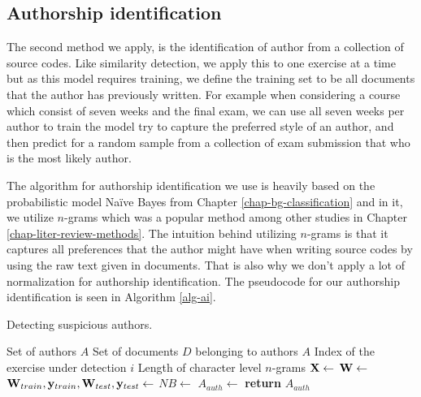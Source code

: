 \subsection{Authorship identification}

The second method we apply, is the identification of author from a collection of source codes. Like similarity detection, we apply this to one exercise at a time but as this model requires training, we define the training set to be all documents that the author has previously written. For example when considering a course which consist of seven weeks and the final exam, we can use all seven weeks per author to train the model \ie try to capture the preferred style of an author, and then predict for a random sample from a collection of exam submission that who is the most likely author.  

The algorithm for authorship identification we use is heavily based on the probabilistic model Naïve Bayes from Chapter \ref{chap-bg-classification} and in it, we utilize $n$-grams which was a popular method among other studies in Chapter \ref{chap-liter-review-methods}. The intuition behind utilizing $n$-grams is that it captures all preferences that the author might have when writing source codes by using the raw text given in documents. That is also why we don't apply a lot of normalization for authorship identification. The pseudocode for our authorship identification is seen in Algorithm \ref{alg-ai}.


\begin{algorithm}[ht]
\caption{Detecting suspicious authors.}
\label{alg-ai}
\begin{algorithmic}

\Require Set of authors $A$
\Require Set of documents $D$ belonging to authors $A$
\Require Index of the exercise under detection $i$
\Require Length of character level $n$-grams
   \State $\mathbf{X} \gets$ 
   \State $\mathbf{W} \gets$ 
   \State $\mathbf{W}_{train}, \mathbf{y}_{train}, \mathbf{W}_{test}, \mathbf{y}_{test} \gets$ 
   \State $NB \gets$ 
   \State $A_{auth} \gets$ 
   \State \textbf{return} $A_{auth}$
\EndProcedure
\end{algorithmic}
\end{algorithm}

